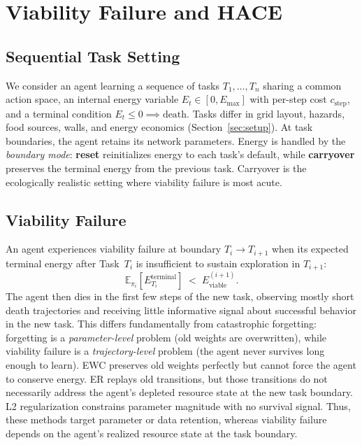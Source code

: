 \documentclass[sigplan,10pt]{acmart}
\newcommand{\energy}{E}
\begin{document}
\section{Viability Failure and HACE}
\label{sec:method}

\subsection{Sequential Task Setting}

We consider an agent learning a sequence of tasks $T_1, \ldots, T_n$
sharing a common action space, an internal energy variable
$\energy_t \in [0, \energy_{\max}]$ with per-step cost $c_{\text{step}}$,
and a terminal condition $\energy_t \leq 0 \implies \text{death}$.  Tasks
differ in grid layout, hazards, food sources, walls, and energy economics
(Section~\ref{sec:setup}).  At task boundaries, the agent retains its
network parameters.  Energy is handled by the \emph{boundary mode}:
\textbf{reset} reinitializes energy to each task's default, while
\textbf{carryover} preserves the terminal energy from the previous task.
Carryover is the ecologically realistic setting where viability failure is
most acute.

\subsection{Viability Failure}

An agent experiences viability failure at boundary $T_i \to T_{i+1}$ when
its expected terminal energy after Task~$T_i$ is insufficient to sustain
exploration in $T_{i+1}$:
\begin{equation}
  \mathbb{E}_{\pi_i}\!\left[\energy_{T_i}^{\text{terminal}}\right]
  \;\!<\;\! \energy_{\text{viable}}^{(i+1)}.
\end{equation}
The agent then dies in the first few steps of the new task, observing
mostly short death trajectories and receiving little informative signal
about successful behavior in the new task.  This differs
fundamentally from catastrophic forgetting: forgetting is a
\emph{parameter-level} problem (old weights are overwritten), while
viability failure is a \emph{trajectory-level} problem (the agent never
survives long enough to learn).  EWC preserves old weights perfectly but
cannot force the agent to conserve energy.  ER replays old transitions,
but those transitions do not necessarily address the agent's depleted
resource state at the new task boundary.  L2
regularization constrains parameter magnitude with no survival signal.
Thus, these methods target parameter or data retention, whereas viability
failure depends on the agent's realized resource state at the task
boundary.
\end{document}
